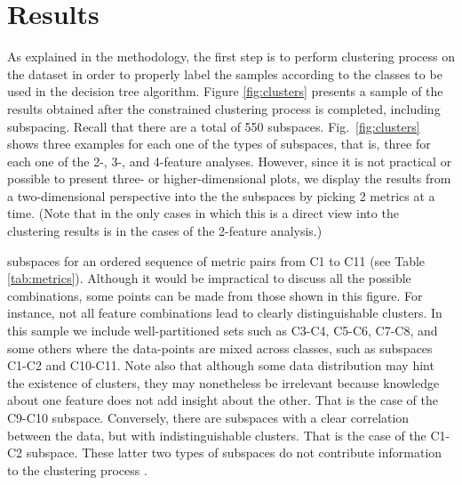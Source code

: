 
\section{Results}
\label{sec:results}

As explained in the methodology, the first step is to perform clustering process on the dataset in order to properly label the samples according to the classes to be used in the decision tree algorithm. Figure \ref{fig:clusters} presents a sample of the results obtained after the constrained \kmeans{} clustering process is completed, including subspacing. Recall that there are a total of 550 subspaces. Fig.~\ref{fig:clusters} shows three examples for each one of the types of subspaces, that is, three for each one of the 2-, 3-, and 4-feature analyses. However, since it is not practical or possible to present three- or higher-dimensional plots, we display the results from a two-dimensional perspective into the the subspaces by picking 2 metrics at a time. (Note that in the only cases in which this is a direct view into the clustering results is in the cases of the 2-feature analysis.)


subspaces for an ordered sequence of metric pairs from C1 to C11 (see Table \ref{tab:metrics}). Although it would be impractical to discuss all the possible combinations, some points can be made from those shown in this figure. For instance, not all feature combinations lead to clearly distinguishable clusters. In this sample we include well-partitioned sets such as C3-C4, C5-C6, C7-C8, and some others where the data-points are mixed across classes, such as subspaces C1-C2 and C10-C11. Note also that although some data distribution may hint the existence of clusters, they may nonetheless be irrelevant because knowledge about one feature does not add insight about the other. That is the case of the C9-C10 subspace. Conversely, there are subspaces with a clear correlation between the data, but with indistinguishable clusters. That is the case of the C1-C2 subspace. These latter two types of subspaces do not contribute information to the clustering process \citep{Dy_2004_MLR}. 

